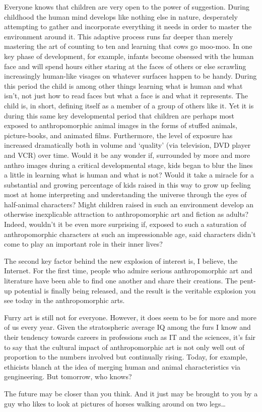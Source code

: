 Everyone knows that children are very open to the power of suggestion. During childhood the human mind develops like nothing else in nature, desperately attempting to gather and incorporate everything it needs in order to master the environment around it. This adaptive process runs far deeper than merely mastering the art of counting to ten and learning that cows go moo-moo. In one key phase of development, for example, infants become obsessed with the human face and will spend hours either staring at the faces of others or else scrawling increasingly human-like visages on whatever surfaces happen to be handy. During this period the child is among other things learning what is human and what isn't, not just how to read faces but what a face is and what it represents. The child is, in short, defining itself as a member of a group of others like it. Yet it is during this same key developmental period that children are perhaps most exposed to anthropomorphic animal images in the forms of stuffed animals, picture-books, and animated films. Furthermore, the level of exposure has increased dramatically both in volume and `quality' (via television, DVD player and VCR) over time. Would it be any wonder if, surrounded by more and more anthro images during a critical developmental stage, kids began to blur the lines a little in learning what is human and what is not? Would it take a miracle for a substantial and growing percentage of kids raised in this way to grow up feeling most at home interpreting and understanding the universe through the eyes of half-animal characters? Might children raised in such an environment develop an otherwise inexplicable attraction to anthropomorphic art and fiction as adults? Indeed, wouldn't it be even more surprising if, exposed to such a saturation of anthropomorphic characters at such an impressionable age, said characters didn't come to play an important role in their inner lives?

The second key factor behind the new explosion of interest is, I believe, the Internet. For the first time, people who admire serious anthropomorphic art and literature have been able to find one another and share their creations. The pent-up potential is finally being released, and the result is the veritable explosion you see today in the anthropomorphic arts.

Furry art is still not for everyone. However, it does seem to be for more and more of us every year. Given the stratospheric average IQ among the furs I know and their tendency towards careers in professions such as IT and the sciences, it's fair to say that the cultural impact of anthropomorphic art is not only well out of proportion to the numbers involved but continually rising. Today, for example, ethicists blanch at the idea of merging human and animal characteristics via gengineering. But tomorrow, who knows?

The future may be closer than you think. And it just may be brought to you by a guy who likes to look at pictures of horses walking around on two legs\ldots
